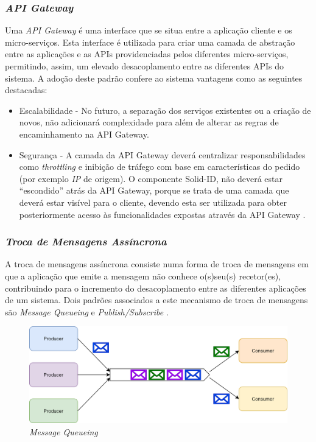 \subsubsection{\emph{API Gateway}} \label{api_gateway}
Uma \emph{API Gateway} é uma interface que se situa entre a aplicação cliente e os micro-serviços. Esta interface é utilizada para criar uma camada de abstração entre as aplicações e as APIs providenciadas pelos diferentes micro-serviços, permitindo, assim, um elevado desacoplamento entre as diferentes APIs do sistema. A adoção deste padrão confere ao sistema vantagens como as seguintes destacadas:
\begin{itemize}
    \item Escalabilidade - No futuro, a separação dos serviços existentes ou a criação de novos, não adicionará complexidade para além de alterar as regras de encaminhamento na API Gateway.
    
    \item Segurança - A camada da API Gateway deverá centralizar responsabilidades como \emph{throttling} e inibição de tráfego com base em características do pedido (por exemplo \emph{IP} de origem). O componente Solid-ID, não deverá estar “escondido” atrás da API Gateway, porque se trata de uma camada que deverá estar visível para o cliente, devendo esta ser utilizada para obter posteriormente acesso às funcionalidades expostas através da API Gateway \cite{}.
\end{itemize}

\subsubsection{\emph{Troca de Mensagens Assíncrona}} \label{troca_mensagens_assincrona}
A troca de mensagens assíncrona consiste numa forma de troca de mensagens em que a aplicação que emite a mensagem não conhece o(s)seu(s) recetor(es), contribuindo para o incremento do desacoplamento entre as diferentes aplicações de um sistema.
Dois padrões associados a este mecanismo de troca de mensagens são \emph{Message Queueing} e \emph{Publish/Subscribe} \cite{building_evolutionary_architectures}.

\begin{figure}[H]
    \begin{center}
    \includegraphics[width=1\textwidth]{figures/message_queueing.png}
    \caption{\emph{Message Queueing}}
    \label{figure_message_queueing}
    \end{center}
\end{figure}

